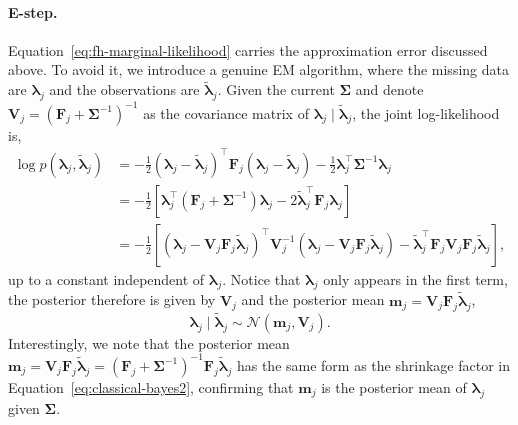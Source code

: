 \paragraph*{E-step.}
\label{para:fhem-estep}
Equation~\eqref{eq:fh-marginal-likelihood} carries the approximation error discussed above. To avoid it, we introduce a genuine EM algorithm, where the missing data are $\bm{\lambda}_j$ and the observations are $\tilde{\bm{\lambda}}_j$. Given the current $\bm{\Sigma}$ and denote $\mathbf{V}_j = \left(\mathbf{F}_j + \bm{\Sigma}^{-1}\right)^{-1}$ as the covariance matrix of $\bm{\lambda}_{j}\mid \tilde{\bm{\lambda}}_{j}$, the joint log-likelihood is,
\begin{align}
    \log p\left(\bm{\lambda}_{j},\tilde{\bm{\lambda}}_{j}\right)&=-\frac{1}{2}\left(\bm{\lambda}_{j}-\tilde{\bm{\lambda}}_{j}\right)^{\top}\mathbf{F}_{j}\left(\bm{\lambda}_{j}-\tilde{\bm{\lambda}}_{j}\right)-\frac{1}{2}\bm{\lambda}_{j}^{\top}\bm{\Sigma}^{-1}\bm{\lambda}_{j}\\
    &=-\frac{1}{2}\left[\bm{\lambda}_{j}^{\top}\left(\mathbf{F}_{j}+\bm{\Sigma}^{-1}\right)\bm{\lambda}_{j}-2\tilde{\bm{\lambda}}_{j}^{\top}\mathbf{F}_{j}\bm{\lambda}_{j}\right]\\
    &=-\frac{1}{2}\left[\left(\bm{\lambda}_{j} - \mathbf{V}_{j} \mathbf{F}_{j} \tilde{\bm{\lambda}}_{j}\right)^{\top} \mathbf{V}_{j}^{-1} \left(\bm{\lambda}_{j} - \mathbf{V}_{j} \mathbf{F}_{j} \tilde{\bm{\lambda}}_{j}\right) - \tilde{\bm{\lambda}}_{j}^{\top} \mathbf{F}_{j} \mathbf{V}_{j} \mathbf{F}_{j} \tilde{\bm{\lambda}}_{j}\right],
    \label{eq:joint-log-density}
\end{align}
up to a constant independent of $\bm{\lambda}_{j}$.
Notice that $\bm{\lambda}_{j}$ only appears in the first term, the posterior therefore is given by $\mathbf{V}_{j}$ and the posterior mean $\mathbf{m}_{j} = \mathbf{V}_{j} \mathbf{F}_{j} \tilde{\bm{\lambda}}_{j}$,
\begin{equation}
    \bm{\lambda}_{j}\mid \tilde{\bm{\lambda}}_{j}\sim \mathcal{N}\left(\mathbf{m}_{j},\mathbf{V}_{j}\right).
    \label{eq:fh-posterior}
\end{equation}
Interestingly, we note that the posterior mean $\mathbf{m}_{j} = \mathbf{V}_{j} \mathbf{F}_{j} \tilde{\bm{\lambda}}_{j}=\left(\mathbf{F}_{j}+\bm{\Sigma}^{-1}\right)^{-1}\mathbf{F}_{j}\tilde{\bm{\lambda}}_{j}$ has the same form as the shrinkage factor in Equation~\eqref{eq:classical-bayes2}, confirming that $\mathbf{m}_{j}$ is the posterior mean of $\bm{\lambda}_{j}$ given $\bm{\Sigma}$.

